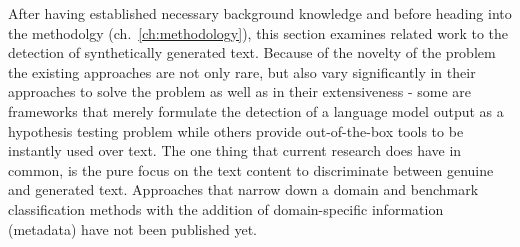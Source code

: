 After having established necessary background knowledge and before heading into the methodolgy (ch.~\ref{ch:methodology}), this section examines related work to the detection of synthetically generated text. Because of the novelty of the problem the existing approaches are not only rare, but also vary significantly in their approaches to solve the problem as well as in their extensiveness - some are frameworks that merely formulate the detection of a language model output as a hypothesis testing problem while others provide out-of-the-box tools to be instantly used over text. The one thing that current research does have in common, is the pure focus on the text content to discriminate between genuine and generated text. Approaches that narrow down a domain and benchmark classification methods with the addition of domain-specific information (metadata) have not been published yet.






